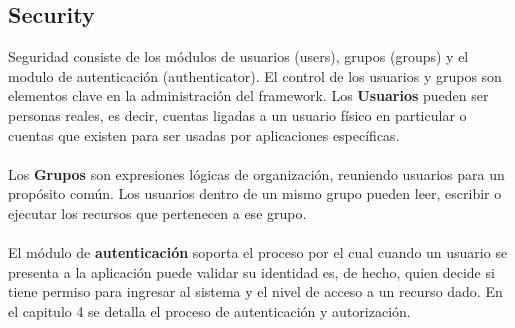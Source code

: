 \subsection{Security}
Seguridad consiste de los módulos de usuarios (users), grupos (groups) y el modulo de autenticación (authenticator). El control de los usuarios y grupos son elementos clave en la administración del framework. Los \textbf{Usuarios} pueden ser personas reales, es decir, cuentas ligadas a un usuario físico en particular o cuentas que existen para ser usadas por aplicaciones específicas. \\
\\
Los \textbf{Grupos} son expresiones lógicas de organización, reuniendo usuarios para un propósito común. Los usuarios dentro de un mismo grupo pueden leer, escribir o ejecutar los recursos que pertenecen a ese grupo.\\
\\
El módulo de \textbf{autenticación} soporta el proceso por el cual cuando un usuario se presenta a la aplicación puede validar su identidad es, de hecho, quien decide si tiene permiso para ingresar al sistema y el nivel de acceso a un recurso dado. En el capitulo 4 se detalla el proceso de autenticación y autorización.

